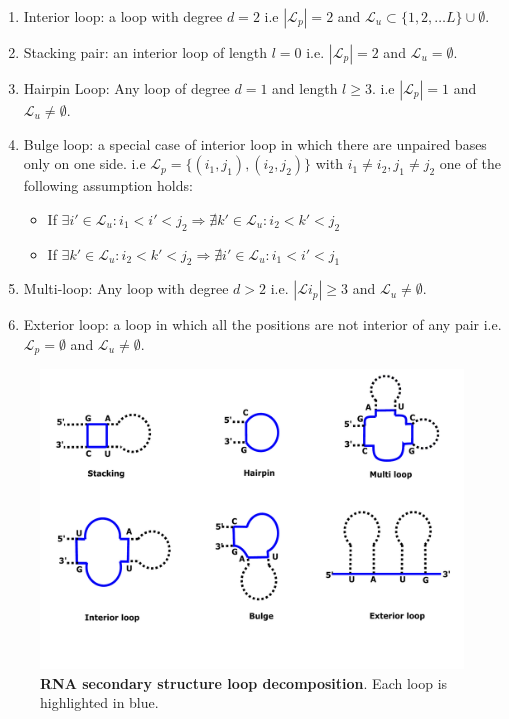 \begin{enumerate}
	\item Interior loop: a loop with degree $d=2$ i.e $|\mathcal{L}_p|=2$ and $\mathcal{L}_u \subset \{1,2,\dots L\}\cup \emptyset$.
	\item Stacking pair: an interior loop of length $l=0$ i.e. $|\mathcal{L}_p|=2$ and $\mathcal{L}_u = \emptyset$.
	\item Hairpin Loop: Any loop of degree $d=1$ and length $l \geq 3$.  i.e $|\mathcal{L}_p|=1$ and  $\mathcal{L}_u \neq \emptyset$.
	\item Bulge loop: a special case of interior loop in which there are unpaired bases only on one side. i.e  $\mathcal{L}_p=\{(i_1,j_1), (i_2, j_2)\}$ with $i_1 \neq i_2, j_1\neq j_2$ one of the following assumption holds: 
		\begin{itemize}
			\item If $\exists i'\in \mathcal{L}_u \colon i_1<i'<j_2 \Rightarrow \nexists k'\in \mathcal{L}_u \colon i_2<k'<j_2$ 
			\item If $\exists k'\in \mathcal{L}_u \colon i_2<k'<j_2 \Rightarrow \nexists i'\in \mathcal{L}_u \colon i_1<i'<j_1$ 
		\end{itemize}
	\item Multi-loop: Any loop with degree $d>2$ i.e.  $|\mathcal{L}i_p| \geq 3$  and $\mathcal{L}_u \neq \emptyset$.
	\item Exterior loop: a loop in which all the positions are not interior of any pair i.e. $\mathcal{L}_p=\emptyset$ and $\mathcal{L}_u \neq \emptyset$.
\end{enumerate}

\begin{figure}[H]
	\includegraphics[width=1.0 \linewidth]{../res/images/loops.pdf}
	\caption{\textbf{RNA secondary structure loop decomposition}. Each loop is highlighted in blue.}\label{fig:loops}
\end{figure}

